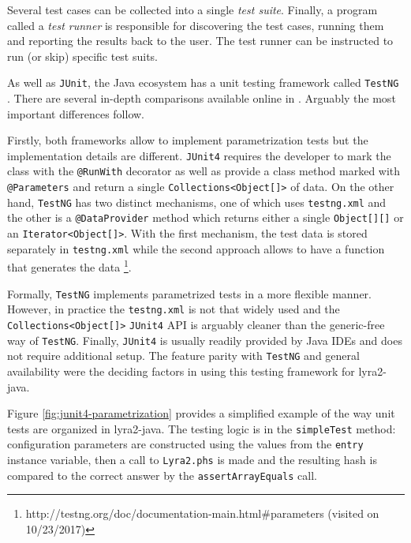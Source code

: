 Several test cases can be collected into a single \emph{test suite}. Finally, a program called a \emph{test runner} is responsible for discovering the test cases, running them and reporting the results back to the user. The test runner can be instructed to run (or skip) specific test suits.

As well as \texttt{JUnit}, the Java ecosystem has a unit testing framework called \texttt{TestNG} \cite{testng:2017:home}. There are several in-depth comparisons available online in \cite{mkyong:2017:testng-vs-junit, wiki:2017:testng-vs-junit}. Arguably the most important differences follow.

Firstly, both frameworks allow to implement parametrization tests but the implementation details are different.  \texttt{JUnit4} requires the developer to mark the class with the \texttt{@RunWith} decorator as well as provide a class method marked with \texttt{@Parameters} and return a single \texttt{Collections<Object[]>} of data. On the other hand, \texttt{TestNG} has two distinct mechanisms, one of which uses \texttt{testng.xml} and the other is a \texttt{@DataProvider} method which returns either a single \texttt{Object[][]} or an \texttt{Iterator<Object[]>}. With the first mechanism, the test data is stored separately in \texttt{testng.xml} while the second approach allows to have a function that generates the data \footnote{http://testng.org/doc/documentation-main.html\#parameters (visited on 10/23/2017)}.

Formally, \texttt{TestNG} implements parametrized tests in a more flexible manner. However, in practice the \texttt{testng.xml} is not that widely used and the \texttt{Collections<Object[]>} \texttt{JUnit4} API is arguably cleaner than the generic-free way of \texttt{TestNG}. Finally, \texttt{JUnit4} is usually readily provided by Java IDEs and does not require additional setup. The feature parity with \texttt{TestNG} and general availability were the deciding factors in using this testing framework for lyra2-java.

Figure \ref{fig:junit4-parametrization} provides a simplified example of the way unit tests are organized in lyra2-java. The testing logic is in the \texttt{simpleTest} method: configuration parameters are constructed using the values from the \texttt{entry} instance variable, then a call to \texttt{Lyra2.phs} is made and the resulting hash is compared to the correct answer by the \texttt{assertArrayEquals} call.

